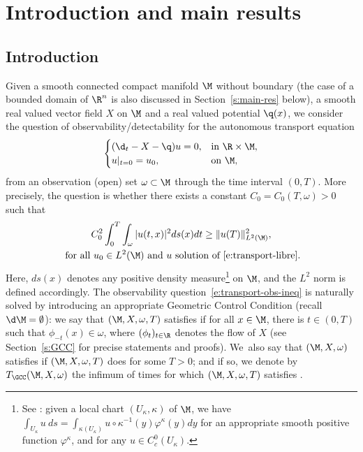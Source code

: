 \section{Introduction and main results}

\subsection{Introduction}
\label{s:intro-intro}
Given a smooth connected compact manifold $\M$ without boundary (the case of a bounded domain of $\R^n$ is also discussed in Section~\ref{s:main-res} below), a smooth real valued vector field $X$ on $\M$ and a real valued potential $\q(x)$, we consider the question of observability/detectability for the autonomous transport equation
\begin{equation}
\label{e:transport-libre}
\begin{cases}
(\d_t - X-\q) u = 0, & \text{in } \R\times \M, \\
u|_{t=0} = u_0, & \text{on } \M,
\end{cases}
\end{equation}
from an observation (open) set $\omega \subset \M$ through the time interval $(0,T)$. More precisely, the question is whether there exists a constant $C_0=C_0(T,\omega)>0$ such that
\begin{multline}
\label{e:transport-obs-ineq}
C_0^2 \int_0^T\int_\omega |u(t,x)|^2 ds(x)dt \geq \|u (T)\|_{L^2(\M)}^2, \\
\text{ for all } u_0 \in L^2(\M) \text{ and } u \text{ solution of~\eqref{e:transport-libre}}.
\end{multline}
Here, $ds(x)$ denotes any positive density measure\footnote{See \eg \cite[Chap.\,16 p.\,427]{Lee:book}: given a local chart $(U_\kappa, \kappa)$ of $\M$, we have $\int_{U_\kappa} u \ ds= \int_{\kappa(U_\kappa)} u\circ \kappa^{-1}(y) \varphi^\kappa(y) dy$ for an appropriate smooth positive function $\varphi^\kappa$, and for any $u \in C^0_c(U_\kappa)$.} on $\M$, and the $L^2$ norm is defined accordingly.
The observability question~\eqref{e:transport-obs-ineq} is naturally solved by introducing an appropriate Geometric Control Condition (recall $\d\M=\emptyset$): we say that $(\M,X,\omega,T)$ satisfies \pGCC if for all $x\in \M$, there is $t \in (0,T)$ such that $\phi_{-t}(x)\in \omega$, where $(\phi_t)_{t\in\R}$ denotes the flow of $X$ (see Section~\ref{s:GCC} for precise statements and proofs). We~also say that $(\M,X,\omega)$ satisfies \pGCC if $(\M,X,\omega,T)$ does for some $T>0$; and if so, we denote by $T_{\GCC}(\M,X,\omega)$ the infimum of times for which $(\M,X,\omega,T)$ satisfies \pGCC.

